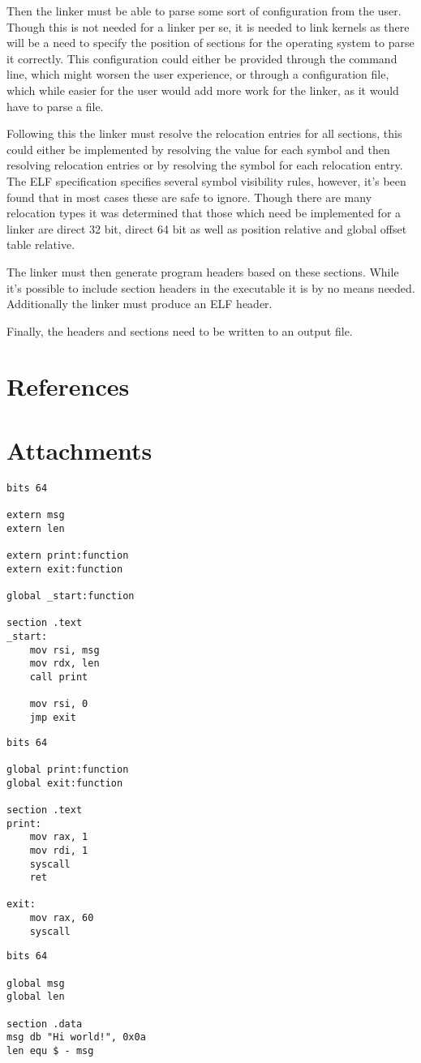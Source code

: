 \documentclass{article}
\begin{document}
Then the linker must be able to parse some sort of configuration from the user. Though this is not needed for a linker per se, it is needed to link kernels as there will be a need to specify the position of sections for the operating system to parse it correctly. This configuration could either be provided through the command line, which might worsen the user experience, or through a configuration file, which while easier for the user would add more work for the linker, as it would have to parse a file.

Following this the linker must resolve the relocation entries for all sections, this could either be implemented by resolving the value for each symbol and then resolving relocation entries or by resolving the symbol for each relocation entry. The ELF specification specifies several symbol visibility rules, however, it's been found that in most cases these are safe to ignore. Though there are many relocation types it was determined that those which need be implemented for a linker are direct 32 bit, direct 64 bit as well as position relative and global offset table relative.

The linker must then generate program headers based on these sections. While it's possible to include section headers in the executable it is by no means needed. Additionally the linker must produce an ELF header.

Finally, the headers and sections need to be written to an output file.

\section{References}
\printbibliography[heading=none]

\section{Attachments}

\begin{verbatim}
bits 64

extern msg
extern len

extern print:function
extern exit:function

global _start:function

section .text
_start:
    mov rsi, msg
    mov rdx, len
    call print

    mov rsi, 0
    jmp exit
\end{verbatim}

\begin{verbatim}
bits 64

global print:function
global exit:function

section .text
print:
    mov rax, 1
    mov rdi, 1
    syscall
    ret

exit:
    mov rax, 60
    syscall
\end{verbatim}

\begin{verbatim}
bits 64

global msg
global len

section .data
msg db "Hi world!", 0x0a
len equ $ - msg
\end{verbatim}
\end{document}
